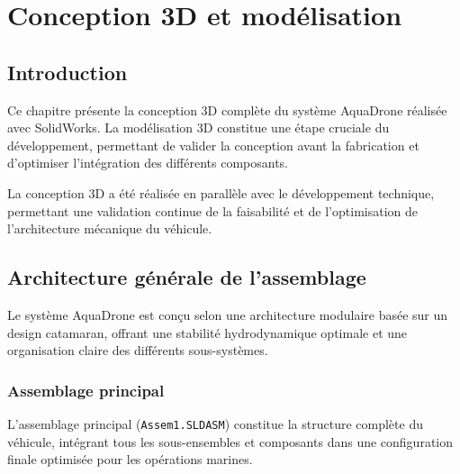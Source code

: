 \chapter[Conception 3D et modélisation]{Conception 3D et modélisation}
\label{cp:conception-3d}

{
\parindent0pt

\section{Introduction}
Ce chapitre présente la conception 3D complète du système AquaDrone réalisée avec SolidWorks. La modélisation 3D constitue une étape cruciale du développement, permettant de valider la conception avant la fabrication et d'optimiser l'intégration des différents composants.

\begin{block}[note]
La conception 3D a été réalisée en parallèle avec le développement technique, permettant une validation continue de la faisabilité et de l'optimisation de l'architecture mécanique du véhicule.
\end{block}

\section{Architecture générale de l'assemblage}
Le système AquaDrone est conçu selon une architecture modulaire basée sur un design catamaran, offrant une stabilité hydrodynamique optimale et une organisation claire des différents sous-systèmes.

\subsection{Assemblage principal}
L'assemblage principal (\texttt{Assem1.SLDASM}) constitue la structure complète du véhicule, intégrant tous les sous-ensembles et composants dans une configuration finale optimisée pour les opérations marines.

}
